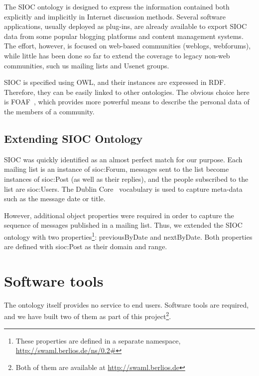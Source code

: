 \documentclass{llncs}
\begin{document}

The SIOC ontology is designed to express the information contained
both explicitly  and implicitly in Internet discussion methods. Several 
software applications, usually deployed as plug-ins, are already available 
to export SIOC data from some popular blogging platforms and content 
management systems. The effort, however, is focused on web-based communities 
(weblogs, webforums), while little has been done so far to extend the coverage 
to legacy non-web communities, such us mailing lists and Usenet groups.

SIOC is specified using OWL, and their instances are expressed
in RDF. Therefore, they can be easily linked to other ontologies.
The obvious choice here is FOAF~\cite{FOAF}, which provides more
powerful means to describe the personal data of the members of
a community.

\subsection{Extending SIOC Ontology}

SIOC was quickly identified as an almost perfect match for our
purpose. Each mailing list is an instance of \textsf{sioc:Forum},
messages sent to the list become instances of \textsf{sioc:Post}
(as well as their replies), and the people subscribed to the
list are \textsf{sioc:User}s. The Dublin Core~\cite{DublinCore}
vocabulary is used to capture meta-data such as the message
date or title.

However, additional object properties were required
in order to capture the sequence of messages published in a
mailing list. Thus, we extended the SIOC ontology with two
properties\footnote{These properties are defined in a separate
namespace, \url{http://swaml.berlios.de/ns/0.2\#}}:
\textsf{previousByDate} and \textsf{nextByDate}. Both properties
are defined with \textsf{sioc:Post} as their domain and range.

\section{\label{sec:tools}Software tools}

The ontology itself provides no service to end users. Software tools
are required, and we have built two of them as part of this
project\footnote{Both of them are available at \url{http://swaml.berlios.de}}.
\end{document}
